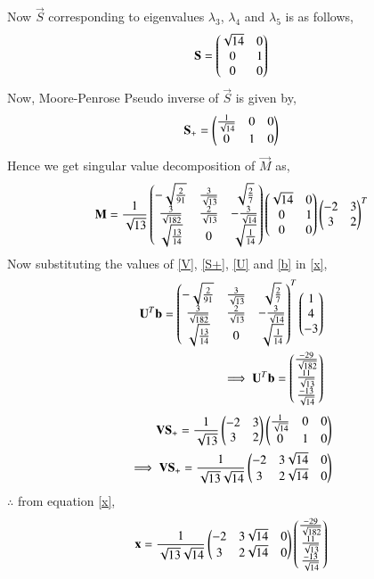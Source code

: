 \documentclass[journal,12pt,twocolumn]{IEEEtran}
\begin{document}
Now $\vec{S}$ corresponding to eigenvalues $\lambda_3$, $\lambda_4$ and  $\lambda_5$ is as follows,
\begin{align}
\mathbf{S} = \begin{pmatrix}\sqrt{14}&0\\0&1\\0&0\end{pmatrix}
\end{align}
Now, Moore-Penrose Pseudo inverse of $\vec{S}$ is given by,
\begin{align}
\mathbf{S}_+ = \begin{pmatrix}\frac{1}{\sqrt{14}}&0&0\\0&1&0\end{pmatrix}\label{S+}
\end{align}
Hence we get singular value decomposition of $\vec{M}$ as,
\begin{align}
\mathbf{M} = \frac{1}{\sqrt{13}}\begin{pmatrix}-\sqrt{\frac{2}{91}} &\frac{3}{\sqrt{13}} & \sqrt{\frac{2}{7}}\\\frac{3}{\sqrt{182}} &\frac{2}{\sqrt{13}} &-\frac{3}{\sqrt{14}} \\\sqrt{\frac{13}{14}} &0 & \sqrt{\frac{1}{14}}\end{pmatrix}\begin{pmatrix}\sqrt{14}&0\\0&1\\0&0\end{pmatrix}\begin{pmatrix}-2&3\\3&2\end{pmatrix}^T
\end{align}
Now substituting the values of \eqref{V}, \eqref{S+}, \eqref{U} and \eqref{b} in \eqref{x},
\begin{align}
\mathbf{U}^T\mathbf{b} = \begin{pmatrix}-\sqrt{\frac{2}{91}} &\frac{3}{\sqrt{13}} & \sqrt{\frac{2}{7}}\\\frac{3}{\sqrt{182}} &\frac{2}{\sqrt{13}} &-\frac{3}{\sqrt{14}} \\\sqrt{\frac{13}{14}} &0 & \sqrt{\frac{1}{14}}\end{pmatrix}^T\begin{pmatrix}1\\4\\-3\end{pmatrix}\\
\implies \mathbf{U}^T\mathbf{b} = \begin{pmatrix}\frac{-29}{\sqrt{182}}\\\frac{11}{\sqrt{13}}\\\frac{-13}{\sqrt{14}}\end{pmatrix}\label{Utb}
\end{align}
\begin{align}
\mathbf{V}\mathbf{S}_+ = \frac{1}{\sqrt{13}}\begin{pmatrix}-2&3\\3&2\end{pmatrix}\begin{pmatrix}\frac{1}{\sqrt{14}}&0&0\\0&1&0\end{pmatrix}\\
\implies \mathbf{V}\mathbf{S}_+ =\frac{1}{\sqrt{13}\sqrt{14}}\begin{pmatrix}-2&3\sqrt{14}&0\\3&2\sqrt{14}&0\end{pmatrix}
\end{align}
$\therefore$ from equation \eqref{x},
\begin{align}
\mathbf{x} = \frac{1}{\sqrt{13}\sqrt{14}}\begin{pmatrix}-2&3\sqrt{14}&0\\3&2\sqrt{14}&0\end{pmatrix} \begin{pmatrix}\frac{-29}{\sqrt{182}}\\\frac{11}{\sqrt{13}}\\\frac{-13}{\sqrt{14}}\end{pmatrix}\label{fx}
\end{align} 
\end{document}
